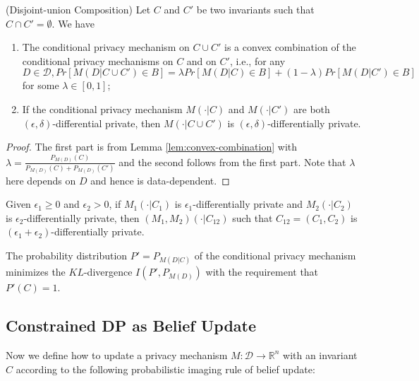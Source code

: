 \documentclass[11pt]{article}
\begin{document}
\begin{theorem} \label{thm:disjoint-union} (Disjoint-union Composition) Let $C$ and $C'$ be two invariants such that $C\cap C' = \emptyset$. We have 
	\begin{enumerate}
		\item The conditional privacy mechanism on $C\cup C'$ is a convex combination of the conditional privacy mechanisms on $C$ and on $C'$, i.e., for any $D\in \mathcal{D}, Pr[M(D | C\cup C') \in B] = \lambda  Pr[M(D |C)\in B] + (1-\lambda) Pr[M(D |C')\in B]$ for some $\lambda \in [0,1]$;
		\item If the conditional privacy mechanism $M( \cdot|C)$ and $M(\cdot | C')$ are both $(\epsilon,\delta)$-differential private, then $M(\cdot | C\cup C')$ is $(\epsilon, \delta)$-differentially private. 
	\end{enumerate}
\end{theorem}
\begin{proof} The first part is from Lemma \ref{lem:convex-combination} with $\lambda = \frac{P_{M(D)}(C)}{P_{M(D)}(C)+ P_{M(D)}(C')}$ and the second follows from the first part. Note that $\lambda$ here depends on $D$ and hence is data-dependent. 
\end{proof}

\begin{lemma} \label{lem:composition-conditioning} Given $\epsilon_1 \geq 0$ and $\epsilon_2 > 0$, if $M_1(\cdot | C_1)$ is $\epsilon_1$-differentially private and $M_2(\cdot | C_2)$ is $\epsilon_2$-differentially private, then $(M_1, M_2)(\cdot| C_{12})$ such that $C_{12}= (C_1, C_2)$ is $(\epsilon_1+\epsilon_2)$-differentially private. 
\end{lemma}


The probability distribution $P'= P_{M(D|C)}$ of the conditional privacy mechanism minimizes the $KL$-divergence $I(P', P_{M(D)})$ with the requirement that $P'(C)=1$.









\subsection{Constrained DP as Belief Update}
Now we define how to update a privacy mechanism $M:\mathcal{D}\rightarrow \mathbb{R}^n$ with an invariant $C$ according to the following probabilistic imaging rule of belief update:
\end{document}
